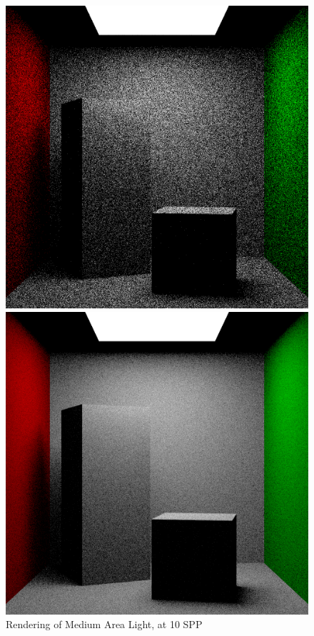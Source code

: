 \documentclass[a4paper]{myarticle}
\begin{document}
\begin{figure}[H]
  \begin{minipage}[t]{.3\textwidth}
      \centering
      \includegraphics[width=\textwidth]{q3/med_1_10.png}
      \caption{Rendering of Medium Area Light, at 10 SPP}
  \end{minipage}
  \hfill
  \begin{minipage}[t]{.3\textwidth}
      \centering
      \includegraphics[width=\textwidth]{q3/med_1_100.png}

\end{minipage}
\end{figure}
\end{document}
